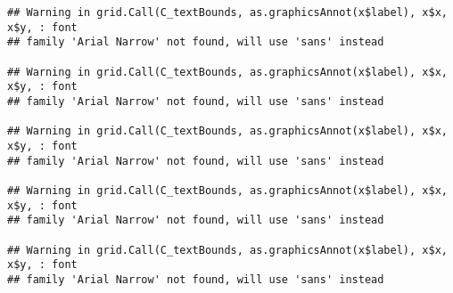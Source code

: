 \documentclass[
]{article}
\begin{document}
\begin{verbatim}
## Warning in grid.Call(C_textBounds, as.graphicsAnnot(x$label), x$x, x$y, : font
## family 'Arial Narrow' not found, will use 'sans' instead

## Warning in grid.Call(C_textBounds, as.graphicsAnnot(x$label), x$x, x$y, : font
## family 'Arial Narrow' not found, will use 'sans' instead

## Warning in grid.Call(C_textBounds, as.graphicsAnnot(x$label), x$x, x$y, : font
## family 'Arial Narrow' not found, will use 'sans' instead

## Warning in grid.Call(C_textBounds, as.graphicsAnnot(x$label), x$x, x$y, : font
## family 'Arial Narrow' not found, will use 'sans' instead

## Warning in grid.Call(C_textBounds, as.graphicsAnnot(x$label), x$x, x$y, : font
## family 'Arial Narrow' not found, will use 'sans' instead
\end{verbatim}
\end{document}
